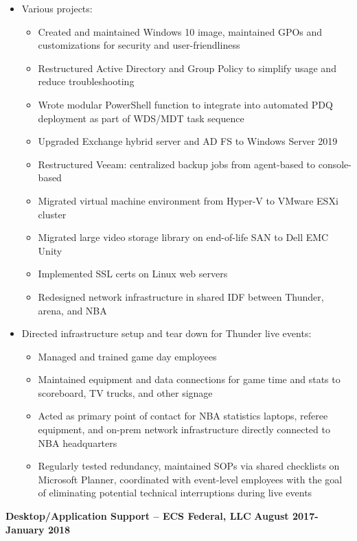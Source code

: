 \documentclass[line]{res}
\begin{document}
\begin{resume}
\begin{itemize}
\begin{itemize}
			\end{itemize}
		\item Various projects:
			\begin{itemize}
				\item Created and maintained Windows 10 image, maintained GPOs and customizations for security and user-friendliness
				\item Restructured Active Directory and Group Policy to simplify usage and reduce troubleshooting
				\item Wrote modular PowerShell function to integrate into automated PDQ deployment as part of WDS/MDT task sequence
				\item Upgraded Exchange hybrid server and AD FS to Windows Server 2019
				\item Restructured Veeam: centralized backup jobs from agent-based to console-based 
				\item Migrated virtual machine environment from Hyper-V to VMware ESXi cluster 
				\item Migrated large video storage library on end-of-life SAN to Dell EMC Unity
				\item Implemented SSL certs on Linux web servers
				\item Redesigned network infrastructure in shared IDF between Thunder, arena, and NBA
			\end{itemize}
		\item Directed infrastructure setup and tear down for Thunder live events:
			\begin{itemize}
				\item Managed and trained game day employees
				\item Maintained equipment and data connections for game time and stats to scoreboard, TV trucks, and other signage
				\item Acted as primary point of contact for NBA statistics laptops, referee equipment, and on-prem network infrastructure directly connected to NBA headquarters 
				\item Regularly tested redundancy, maintained SOPs via shared checklists on Microsoft Planner, coordinated with event-level employees with the goal of eliminating potential technical interruptions during live events
			\end{itemize}
	\end{itemize}
\textbf{Desktop/Application Support -- ECS Federal, LLC}
\newline
\textbf{August 2017-January 2018}
	\begin{itemize}

\end{itemize}
\end{resume}
\end{document}

